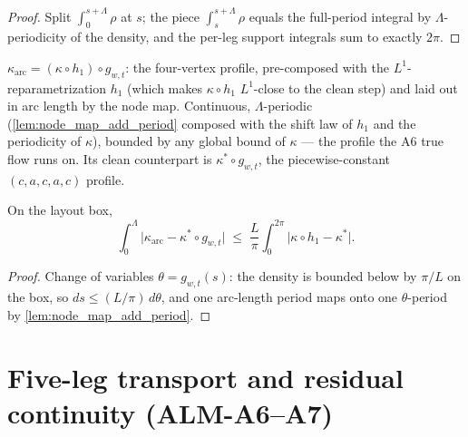 \begin{proof}
  \leanok
  Split $\int_0^{s+\Lambda}\rho$ at $s$; the piece $\int_s^{s+\Lambda}\rho$
  equals the full-period integral by $\Lambda$-periodicity of the density,
  and the per-leg support integrals sum to exactly $2\pi$.
\end{proof}

\begin{definition}
  \label{def:kappa_arc}
  $\kappa_{\mathrm{arc}}=(\kappa\circ h_1)\circ g_{w,t}$: the four-vertex
  profile, pre-composed with the $L^1$-reparametrization $h_1$ (which makes
  $\kappa\circ h_1$ $L^1$-close to the clean step) and laid out in arc length
  by the node map.  Continuous, $\Lambda$-periodic
  (\cref{lem:node_map_add_period} composed with the shift law of $h_1$ and
  the periodicity of $\kappa$), bounded by any global bound of $\kappa$ —
  the profile the A6 true flow runs on.  Its clean counterpart is
  $\kappa^*\circ g_{w,t}$, the piecewise-constant $(c,a,c,a,c)$ profile.
\end{definition}

\begin{lemma}
  \label{lem:kappa_arc_comp_L1}
  On the layout box,
  \[
    \int_0^{\Lambda}\bigl|\kappa_{\mathrm{arc}}-\kappa^*\!\circ g_{w,t}\bigr|
    \;\le\;\frac L\pi\int_0^{2\pi}\bigl|\kappa\circ h_1-\kappa^*\bigr| .
  \]
\end{lemma}

\begin{proof}
  \leanok
  Change of variables $\theta=g_{w,t}(s)$: the density is bounded below by
  $\pi/L$ on the box, so $ds\le(L/\pi)\,d\theta$, and one arc-length period
  maps onto one $\theta$-period by \cref{lem:node_map_add_period}.
\end{proof}

\section{Five-leg transport and residual continuity (ALM-A6--A7)}

